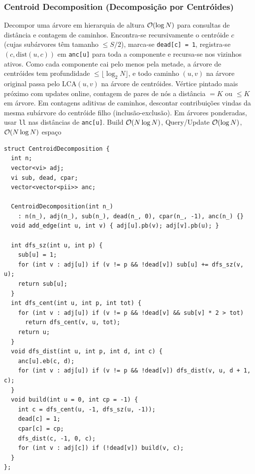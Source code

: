 \subsubsection{Centroid Decomposition (Decomposição por Centróides)}
\algobox
  {Decompor uma árvore em hierarquia de altura $\mathcal{O}(\log N)$ para consultas de distância e contagem de caminhos.}
  {Encontra-se recursivamente o centróide $c$ (cujas subárvores têm tamanho $\le S/2$), marca-se \texttt{dead[c] = 1}, registra-se $(c, \text{dist}(u, c))$ em \texttt{anc[u]} para toda a componente e recursa-se nos vizinhos ativos.}
  {Como cada componente cai pelo menos pela metade, a árvore de centróides tem profundidade $\le \lfloor \log_2 N \rfloor$, e todo caminho $(u, v)$ na árvore original passa pelo $\text{LCA}(u, v)$ na árvore de centróides.}
  {Vértice pintado mais próximo com updates online, contagem de pares de nós a distância $= K$ ou $\le K$ em árvore.}
  {Em contagens aditivas de caminhos, descontar contribuições vindas da mesma subárvore do centróide filho (inclusão-exclusão). Em árvores ponderadas, usar \texttt{ll} nas distâncias de \texttt{anc[u]}.}
  {Build $\mathcal{O}(N \log N)$, Query/Update $\mathcal{O}(\log N)$, $\mathcal{O}(N \log N)$ espaço}

\begin{lstlisting}
struct CentroidDecomposition {
  int n;
  vector<vi> adj;
  vi sub, dead, cpar;
  vector<vector<pii>> anc;

  CentroidDecomposition(int n_)
    : n(n_), adj(n_), sub(n_), dead(n_, 0), cpar(n_, -1), anc(n_) {}
  void add_edge(int u, int v) { adj[u].pb(v); adj[v].pb(u); }

  int dfs_sz(int u, int p) {
    sub[u] = 1;
    for (int v : adj[u]) if (v != p && !dead[v]) sub[u] += dfs_sz(v, u);
    return sub[u];
  }
  int dfs_cent(int u, int p, int tot) {
    for (int v : adj[u]) if (v != p && !dead[v] && sub[v] * 2 > tot)
      return dfs_cent(v, u, tot);
    return u;
  }
  void dfs_dist(int u, int p, int d, int c) {
    anc[u].eb(c, d);
    for (int v : adj[u]) if (v != p && !dead[v]) dfs_dist(v, u, d + 1, c);
  }
  void build(int u = 0, int cp = -1) {
    int c = dfs_cent(u, -1, dfs_sz(u, -1));
    dead[c] = 1;
    cpar[c] = cp;
    dfs_dist(c, -1, 0, c);
    for (int v : adj[c]) if (!dead[v]) build(v, c);
  }
};
\end{lstlisting}

